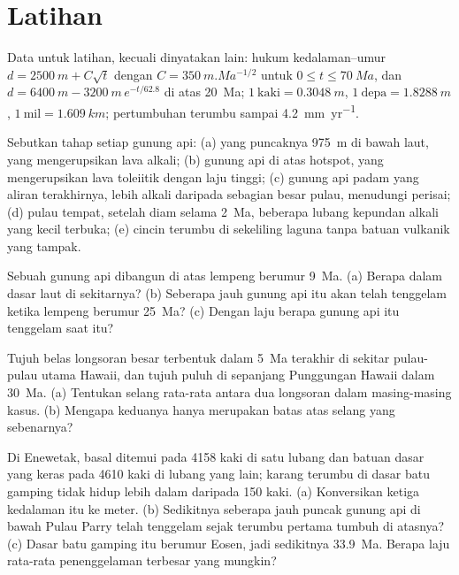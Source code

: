 \section*{Latihan}\label{sec:b2:oceanic-islands:exercises}

Data untuk latihan, kecuali dinyatakan lain: hukum kedalaman--umur $d = \qty{2500}{m} + C\sqrt t$ dengan
$C = \qty{350}{m.Ma^{-1/2}}$ untuk $0 \le t \le \qty{70}{Ma}$, dan $d = \qty{6400}{m} -
\qty{3200}{m}\,e^{-t/62.8}$ di atas \qty{20}{Ma}; $1~\text{kaki} = \qty{0.3048}{m}$, $1~\text{depa}
= \qty{1.8288}{m}$, $1~\text{mil} = \qty{1.609}{km}$; pertumbuhan terumbu sampai \qty{4.2}{mm.yr^{-1}}.

\begin{exercise}[$\star$]\label{exo:b2:oceanic-islands:1}
Sebutkan tahap setiap gunung api: (a)  yang puncaknya \qty{975}{m} di bawah laut, yang mengerupsikan
lava alkali; (b) gunung api di atas hotspot, yang mengerupsikan lava toleiitik dengan laju tinggi; (c) gunung api
padam yang aliran terakhirnya, lebih alkali daripada sebagian besar pulau, menudungi perisai; (d)
pulau tempat, setelah diam selama \qty{2}{Ma}, beberapa lubang kepundan alkali yang kecil terbuka; (e) cincin terumbu
di sekeliling laguna tanpa batuan vulkanik yang tampak.
\end{exercise}

\begin{exercise}[$\star$]\label{exo:b2:oceanic-islands:2}
Sebuah gunung api dibangun di atas lempeng berumur \qty{9}{Ma}. (a) Berapa dalam dasar laut di sekitarnya? (b) Seberapa
jauh gunung api itu akan telah tenggelam ketika lempeng berumur \qty{25}{Ma}? (c) Dengan laju berapa gunung api itu tenggelam saat itu?
\end{exercise}

\begin{exercise}[$\star$]\label{exo:b2:oceanic-islands:3}
Tujuh belas longsoran besar terbentuk dalam \qty{5}{Ma} terakhir di sekitar pulau-pulau utama Hawaii, dan
tujuh puluh di sepanjang Punggungan Hawaii dalam \qty{30}{Ma}. (a) Tentukan selang rata-rata antara dua longsoran dalam
masing-masing kasus. (b) Mengapa keduanya hanya merupakan batas atas selang yang sebenarnya?
\end{exercise}

\begin{exercise}[$\star$]\label{exo:b2:oceanic-islands:4}
Di Enewetak, basal ditemui pada 4158 kaki di satu lubang dan batuan dasar yang keras pada 4610 kaki di lubang
yang lain; karang terumbu di dasar batu gamping tidak hidup lebih dalam daripada 150 kaki. (a) Konversikan
ketiga kedalaman itu ke meter. (b) Sedikitnya seberapa jauh puncak gunung api di bawah Pulau Parry telah
tenggelam sejak terumbu pertama tumbuh di atasnya? (c) Dasar batu gamping itu berumur Eosen, jadi sedikitnya
\qty{33.9}{Ma}. Berapa laju rata-rata penenggelaman terbesar yang mungkin?
\end{exercise}

